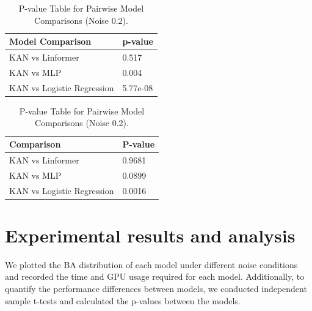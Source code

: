 \documentclass{article}
\begin{document}
\begin{table}[ht]
    \centering
    \begin{minipage}{0.45\textwidth}
        \centering
        \caption{P-value Table for Pairwise Model Comparisons (Noise 0.0).}
        \begin{tabular}{@{}ll@{}}
            \toprule
            Model Comparison & p-value \\ \midrule
            KAN vs Linformer      & 0.517   \\
            KAN vs MLP      & 0.004   \\
            KAN vs Logistic Regression  & 5.77e-08\\
            \bottomrule
        \end{tabular}
        \label{pvalue0}
    \end{minipage}\hfill
    \begin{minipage}{0.45\textwidth}
        \centering
        \caption{P-value Table for Pairwise Model Comparisons (Noise 0.2).}
        \begin{tabular}{@{}ll@{}}
            \toprule
            Comparison          & P-value \\ \midrule
            KAN vs Linformer         & 0.9681  \\
            KAN vs MLP         & 0.0899  \\
            KAN vs Logistic Regression     & 0.0016  \\
            \bottomrule
        \end{tabular}
        \label{pvalue0.2}
    \end{minipage}
\end{table}

 \section{Experimental results and analysis}

We plotted the BA distribution of each model under different noise conditions and recorded the time and GPU usage required for each model. Additionally, to quantify the performance differences between models, we conducted independent sample t-tests and calculated the p-values between the models. 
\end{document}
